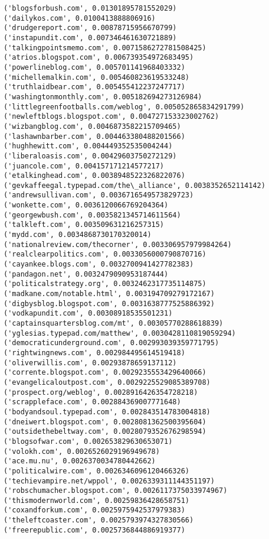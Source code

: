 \documentclass[11pt]{article}
\begin{document}
    \begin{Verbatim}[commandchars=\\\{\}]
('blogsforbush.com', 0.01301895781552029)
('dailykos.com', 0.0100413888806916)
('drudgereport.com', 0.00878715956670799)
('instapundit.com', 0.007346461630721889)
('talkingpointsmemo.com', 0.0071586272781508425)
('atrios.blogspot.com', 0.006739354972683495)
('powerlineblog.com', 0.005701141968403332)
('michellemalkin.com', 0.005460823619533248)
('truthlaidbear.com', 0.005455412237247717)
('washingtonmonthly.com', 0.005182694273126984)
('littlegreenfootballs.com/weblog', 0.005052865834291799)
('newleftblogs.blogspot.com', 0.004727153323002762)
('wizbangblog.com', 0.0046873582215709465)
('lashawnbarber.com', 0.004463380488201566)
('hughhewitt.com', 0.004449352535004244)
('liberaloasis.com', 0.00429603750272129)
('juancole.com', 0.004157171214577217)
('etalkinghead.com', 0.0038948522326822076)
('gevkaffeegal.typepad.com/the\_alliance', 0.0038352652114142)
('andrewsullivan.com', 0.0036716549573829723)
('wonkette.com', 0.0036120066769204364)
('georgewbush.com', 0.0035821345714611564)
('talkleft.com', 0.003509631216257315)
('mydd.com', 0.0034868730170320014)
('nationalreview.com/thecorner', 0.003306957979984264)
('realclearpolitics.com', 0.0033056000790870716)
('cayankee.blogs.com', 0.0032700941427782383)
('pandagon.net', 0.0032479090953187444)
('politicalstrategy.org', 0.0032462317735114875)
('madkane.com/notable.html', 0.003194709279172167)
('digbysblog.blogspot.com', 0.0031638777525886392)
('vodkapundit.com', 0.00308918535501231)
('captainsquartersblog.com/mt', 0.00305770288618839)
('yglesias.typepad.com/matthew', 0.0030428110819059294)
('democraticunderground.com', 0.002993039359771795)
('rightwingnews.com', 0.002984495614519418)
('oliverwillis.com', 0.00293878659137112)
('corrente.blogspot.com', 0.0029235553429640066)
('evangelicaloutpost.com', 0.0029225529085389708)
('prospect.org/weblog', 0.0028916426354728218)
('scrappleface.com', 0.002884369007771648)
('bodyandsoul.typepad.com', 0.002843514783004818)
('dneiwert.blogspot.com', 0.0028081362500395604)
('outsidethebeltway.com', 0.0028079352676298594)
('blogsofwar.com', 0.002653829630653071)
('volokh.com', 0.0026526029196949678)
('ace.mu.nu', 0.0026370034780442662)
('politicalwire.com', 0.0026346096120466326)
('techievampire.net/wppol', 0.0026339311144351197)
('robschumacher.blogspot.com', 0.0026117375033974967)
('thismodernworld.com', 0.00259836428658751)
('coxandforkum.com', 0.0025975942537979383)
('theleftcoaster.com', 0.0025793974327830566)
('freerepublic.com', 0.0025736844886919377)

\end{Verbatim}
\end{document}
